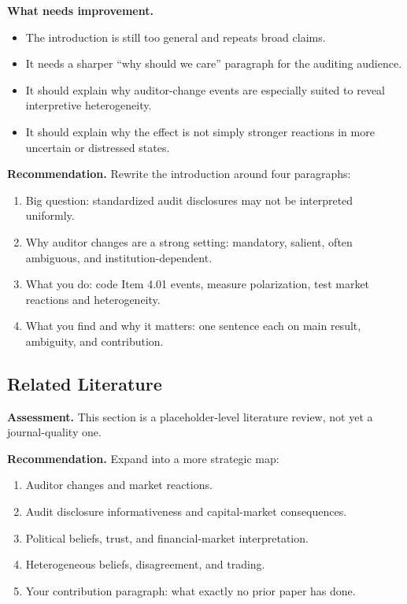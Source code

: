 \documentclass[12pt]{article}
\begin{document}
\textbf{What needs improvement.}
\begin{itemize}[leftmargin=2em]
    \item The introduction is still too general and repeats broad claims.
    \item It needs a sharper ``why should we care'' paragraph for the auditing audience.
    \item It should explain why auditor-change events are especially suited to reveal interpretive heterogeneity.
    \item It should explain why the effect is not simply stronger reactions in more uncertain or distressed states.
\end{itemize}

\textbf{Recommendation.} Rewrite the introduction around four paragraphs:
\begin{enumerate}[leftmargin=2em]
    \item Big question: standardized audit disclosures may not be interpreted uniformly.
    \item Why auditor changes are a strong setting: mandatory, salient, often ambiguous, and institution-dependent.
    \item What you do: code Item 4.01 events, measure polarization, test market reactions and heterogeneity.
    \item What you find and why it matters: one sentence each on main result, ambiguity, and contribution.
\end{enumerate}

\subsection{Related Literature}
\textbf{Assessment.} This section is a placeholder-level literature review, not yet a journal-quality one.

\textbf{Recommendation.} Expand into a more strategic map:
\begin{enumerate}[leftmargin=2em]
    \item Auditor changes and market reactions.
    \item Audit disclosure informativeness and capital-market consequences.
    \item Political beliefs, trust, and financial-market interpretation.
    \item Heterogeneous beliefs, disagreement, and trading.
    \item Your contribution paragraph: what exactly no prior paper has done.
\end{enumerate}
\end{document}
